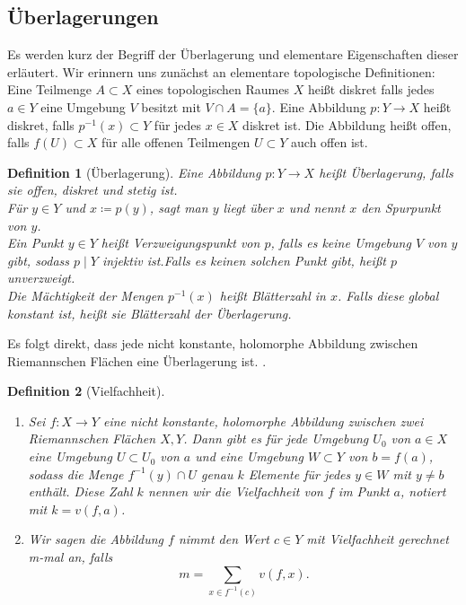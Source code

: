 \documentclass[11pt,a4paper,toc=bibliography]{scrartcl}
\theoremstyle{thm}
\theoremstyle{def}
\newtheorem{defi}{Definition}[section]
\theoremstyle{remark}
\begin{document}
\subsection{Überlagerungen}
Es werden kurz der Begriff der Überlagerung und elementare Eigenschaften dieser erläutert. Wir erinnern uns zunächst an elementare topologische Definitionen:\\
Eine Teilmenge $A\subset X$ eines topologischen Raumes $X$ heißt diskret falls jedes $a\in Y$ eine Umgebung $V$ besitzt mit $V\cap A= \{a\}$. Eine Abbildung $p:Y\rightarrow X$ heißt diskret, falls $p^{-1}(x)\subset Y$  für jedes $x\in X$ diskret ist. Die Abbildung heißt offen, falls $f(U)\subset X$ für alle offenen Teilmengen $U\subset Y$ auch offen ist.
\begin{defi}[Überlagerung]
Eine Abbildung $p:Y\rightarrow X$ heißt \emph{Überlagerung}, falls sie offen, diskret und stetig ist.\\
Für $y\in Y$ und $x\coloneqq p(y)$, sagt man \emph{$y$ liegt über $x$} und nennt $x$ den \emph{Spurpunkt} von $y$.\\
Ein Punkt $y\in Y$ heißt \emph{Verzweigungspunkt} von $p$, falls es keine Umgebung $V$ von $y$ gibt, sodass $p\mid Y$ injektiv ist.Falls es keinen solchen Punkt gibt, heißt $p$ \emph{unverzweigt}.\\
Die Mächtigkeit der Mengen $p^{-1}(x)$ heißt \emph{Blätterzahl in $x$}. Falls diese global konstant ist, heißt sie \emph{Blätterzahl} der Überlagerung.
\end{defi}
Es folgt direkt, dass jede nicht konstante, holomorphe Abbildung zwischen Riemannschen Flächen eine Überlagerung ist. \cite[S.18]{forster}.
\begin{defi}[Vielfachheit]
\begin{enumerate}
    \item
    Sei $f:X\rightarrow Y$ eine nicht konstante, holomorphe Abbildung zwischen zwei Riemannschen Flächen $X,Y$. Dann gibt es für jede Umgebung $U_0$ von $a\in X$ eine Umgebung $U\subset U_0$ von $a$ und eine Umgebung $W\subset Y$ von $b=f(a)$, sodass die Menge $f^{-1}(y)\cap U$ genau $k$ Elemente für jedes $y\in W$ mit $y\neq b$ enthält. Diese Zahl $k$ nennen wir die \emph{Vielfachheit} von $f$ im Punkt $a$, notiert mit $k=v(f,a)$.
    \item
    Wir sagen die Abbildung $f$ nimmt den Wert $c\in Y$ \emph{mit Vielfachheit gerechnet m-mal} an, falls
    \[
    m =\sum_{x\in f^{-1}(c)} v(f,x).
    \]
    \end{enumerate}
\end{defi}
\end{document}
